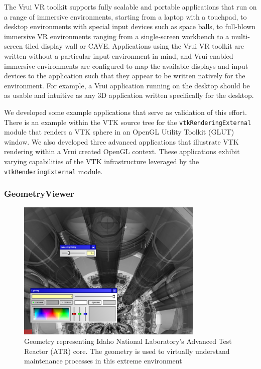 The Vrui VR toolkit supports fully scalable and portable applications that run on a range of immersive environments, starting from a laptop with a touchpad, to desktop environments with special input devices such as space balls, to full-blown immersive VR environments ranging from a single-screen workbench to a multi-screen tiled display wall or CAVE\texttrademark. Applications using the Vrui VR toolkit are written without a particular input environment in mind, and Vrui-enabled immersive environments are configured to map the available displays and input devices to the application such that they appear to be written natively for the environment. For example, a Vrui application running on the desktop should be as usable and intuitive as any 3D application written specifically for the desktop.

We developed some example applications that serve as validation of this effort. There is an example within the VTK source tree for the \texttt{vtkRenderingExternal} module that renders a VTK sphere in an OpenGL Utility Toolkit (GLUT) window. We also developed three advanced applications that illustrate VTK rendering within a Vrui created OpenGL context. These applications exhibit varying capabilities of the VTK infrastructure leveraged by the \texttt{vtkRenderingExternal} module. 

\subsubsection{GeometryViewer}

\begin{figure}[h!]
 \centering
 \includegraphics[width=3.5in]{images/vessel.png}
 \caption{Geometry representing Idaho National Laboratory's Advanced Test Reactor (ATR) core. The geometry is used to virtually understand maintenance processes in this extreme environment}
 \label{fig:vessel}
\end{figure}

